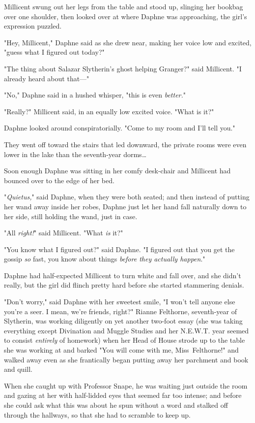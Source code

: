 Millicent swung out her legs from the table and stood up, slinging her bookbag
over one shoulder, then looked over at where Daphne was approaching, the girl's
expression puzzled.

"Hey, Millicent," Daphne said as she drew near, making her voice low and
excited, "guess what I figured out today?"

"The thing about Salazar Slytherin's ghost helping Granger?" said Millicent. "I
already heard about that—"

"No," Daphne said in a hushed whisper, "this is even \emph{better.}"

"Really?" Millicent said, in an equally low excited voice. "What is it?"

Daphne looked around conspiratorially. "Come to my room and I'll tell you."

They went off toward the stairs that led downward, the private rooms were even
lower in the lake than the seventh-year dorms…

Soon enough Daphne was sitting in her comfy desk-chair and Millicent had
bounced over to the edge of her bed.

"\emph{Quietus,}" said Daphne, when they were both seated; and then instead of
putting her wand away inside her robes, Daphne just let her hand fall naturally
down to her side, still holding the wand, just in case.

"All \emph{right!}" said Millicent. "What \emph{is} it?"

"You know what I figured out?" said Daphne. "I figured out that you get the
gossip \emph{so} fast, you know about things \emph{before they actually
happen}."

Daphne had half-expected Millicent to turn white and fall over, and she didn't
really, but the girl did flinch pretty hard before she started stammering
denials.

"Don't worry," said Daphne with her sweetest smile, "I won't tell anyone else
you're a seer. I mean, we're friends, right?"
\later
Rianne Felthorne, seventh-year of Slytherin, was working diligently on yet
another two-foot essay (she was taking everything except Divination and Muggle
Studies and her N.E.W.T. year seemed to consist \emph{entirely} of homework)
when her Head of House strode up to the table she was working at and barked
"You will come with me, Miss~Felthorne!" and walked away even as she
frantically began putting away her parchment and book and quill.

When she caught up with Professor Snape, he was waiting just outside the room
and gazing at her with half-lidded eyes that seemed far too intense; and before
she could ask what this was about he spun without a word and stalked off
through the hallways, so that she had to scramble to keep up.

